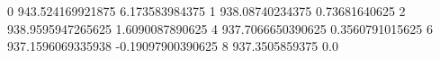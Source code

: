 0 943.524169921875 6.173583984375
1 938.08740234375 0.73681640625
2 938.9595947265625 1.6090087890625
4 937.7066650390625 0.3560791015625
6 937.1596069335938 -0.19097900390625
8 937.3505859375 0.0
